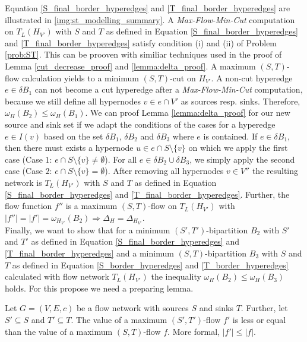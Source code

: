 Equation \ref{S_final_border_hyperedges} and \ref{T_final_border_hyperedges} 
are illustrated in \autoref{img:st_modelling_summary}.
A \emph{Max-Flow-Min-Cut} computation on $T_L(H_{V'})$ with $S$ and $T$ as defined
in Equation \ref{S_final_border_hyperedges} and \ref{T_final_border_hyperedges} satisfy
condition (i) and (ii) of Problem \ref{prob:ST}. This can be prooven with similiar techniques
used in the proof of Lemma \ref{cut_decrease_proof} and \ref{lemma:delta_proof}. A maximum
$(S,T)$-flow calculation yields to a minimum $(S,T)$-cut on $H_{V'}$. A non-cut hyperedge
$e \in \delta B_1$ can not become a cut hyperedge after a \emph{Max-Flow-Min-Cut} computation,
because we still define all hypernodes $v \in e \cap V'$ as sources resp. sinks. Therefore,
$\omega_H(B_2) \le \omega_H(B_1)$. We can proof Lemma \ref{lemma:delta_proof} for our
new source and sink set if we adapt the conditions of the cases for a hyperedge $e \in I(v)$ 
based on the set $\delta B_1$, $\delta B_2$ and $\delta B_3$ where $e$ is contained. If
$e \in \delta B_1$, then there must exists a hypernode $u \in e \cap S \setminus \{v\}$ on
which we apply the first case (Case $1$: $e \cap S \setminus \{v\} \neq \emptyset$). 
For all $e \in \delta B_2 \cup \delta B_3$, we simply apply the second case
(Case $2$: $e \cap S \setminus \{v\} = \emptyset$). After removing all hypernodes $v \in V''$
the resulting network is $T_L(H_{V'})$ with $S$ and $T$ as defined in Equation
\ref{S_final_border_hyperedges} and \ref{T_final_border_hyperedges}. Further, the flow function
$f''$ is a maximum $(S,T)$-flow on $T_L(H_{V'})$ with $|f''| = |f'| = \omega_{H_{V'}}(B_2)
\Rightarrow \Delta_H = \Delta_{H_{V'}}$. \\
Finally, we want to show that for a minimum $(S',T')$-bipartition $B_2$ with $S'$ and $T'$ as defined
in Equation \ref{S_final_border_hyperedges} and \ref{T_final_border_hyperedges} and a minimum
$(S,T)$-bipartition $B_3$ with $S$ and $T$ as defined in Equation \ref{S_border_hyperedges}
and \ref{T_border_hyperedges} calculated with flow network $T_L(H_{V'})$ the inequality 
$\omega_H(B_2) \le \omega_H(B_3)$ holds. For this propose we need a preparing lemma.

\begin{lemma}
\label{lemma:ST_subset}
Let $G = (V,E,c)$ be a flow network with sources $S$ and sinks $T$. Further, let $S' \subseteq S$
and $T' \subseteq T$. The value of a maximum $(S',T')$-flow $f'$ is less or equal than the value
of a maximum $(S,T)$-flow $f$. More formal, $|f'| \le |f|$.
\end{lemma}

